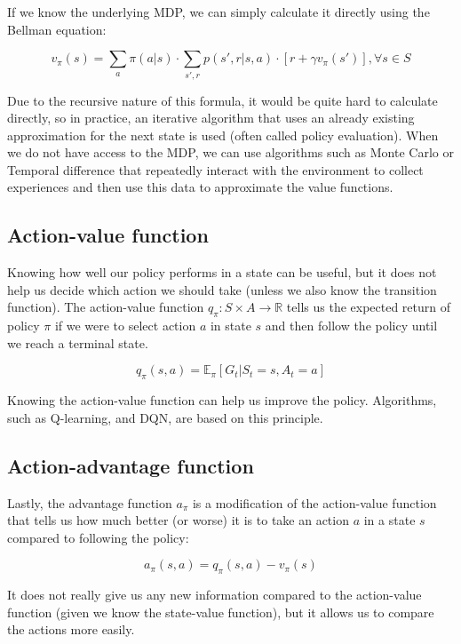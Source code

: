 \documentclass[
  digital,     %
  oneside,     %
  nosansbold,  %
  nocolorbold, %
  lof,         %
  lot,         %
]{fithesis4}
\begin{document}
If we know the underlying MDP, we can simply calculate it directly using the Bellman equation:

\[
v_\pi(s) = \sum_a \pi(a|s) \cdot \sum_{s',r} p(s',r|s,a)\cdot[r+\gamma v_\pi(s')], \forall s \in S
\]

Due to the recursive nature of this formula, it would be quite hard to calculate directly, so in practice, an iterative algorithm that uses an already existing approximation for the next state is used (often called policy evaluation). When we do not have access to the MDP, we can use algorithms such as Monte Carlo or Temporal difference that repeatedly interact with the environment to collect experiences and then use this data to approximate the value functions.

\subsection{Action-value function}

Knowing how well our policy performs in a state can be useful, but it does not help us decide which action we should take (unless we also know the transition function). The action-value function $q_\pi\colon S \times A \to \mathbb{R}$ tells us the expected return of policy $\pi$ if we were to select action $a$ in state $s$ and then follow the policy until we reach a terminal state.

\[
q_\pi(s,a) = \mathbb{E}_\pi [G_t|S_t=s,A_t=a]
\]

Knowing the action-value function can help us improve the policy. Algorithms, such as Q-learning, and DQN, are based on this principle.

\subsection{Action-advantage function}

Lastly, the advantage function $a_\pi$ is a modification of the action-value function that tells us how much better (or worse) it is to take an action $a$ in a state $s$ compared to following the policy:

\[
a_\pi(s,a) = q_\pi(s,a)-v_\pi(s)
\]

It does not really give us any new information compared to the action-value function (given we know the state-value function), but it allows us to compare the actions more easily.
\end{document}

